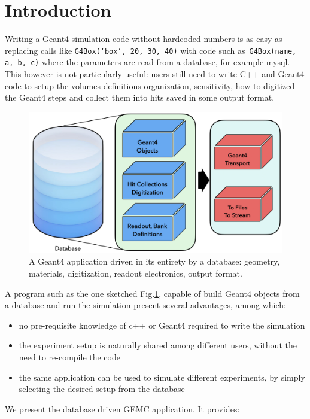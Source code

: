 \section{Introduction}
\label{sec:intro}

Writing a Geant4\cite{geant4} simulation code without hardcoded numbers is
as easy as replacing calls like \verb|G4Box(‘box’, 20, 30, 40)| with
code such as~\verb|G4Box(name, a, b, c)|
where the parameters are read from a database, for example mysql.
This however is not particularly useful: users still need to write C++ and Geant4 code to setup
the volumes definitions organization, sensitivity, how to digitized the Geant4 steps
and collect them into hits saved in some output format.

\begin{figure}[h]

    \centering
    \includegraphics[width=.90\textwidth]{img/db}
    \caption{A Geant4 application driven in its entirety by a database: geometry, materials,
        digitization, readout electronics, output format.}
    \label{fig:db}
\end{figure}

A program such as the one sketched Fig.\ref{fig:db}, capable of build Geant4 objects from a database
and run the simulation present several advantages, among which:

\begin{itemize}
    \item no pre-requisite knowledge of c++ or Geant4 required to write the simulation
    \item the experiment setup is naturally shared among different users, without the need to re-compile  the code
    \item the same application can be used to simulate different experiments, by simply
    selecting the desired setup from the database
\end{itemize}
We present the database driven GEMC\cite{clas12_gemc} application.  It provides:


